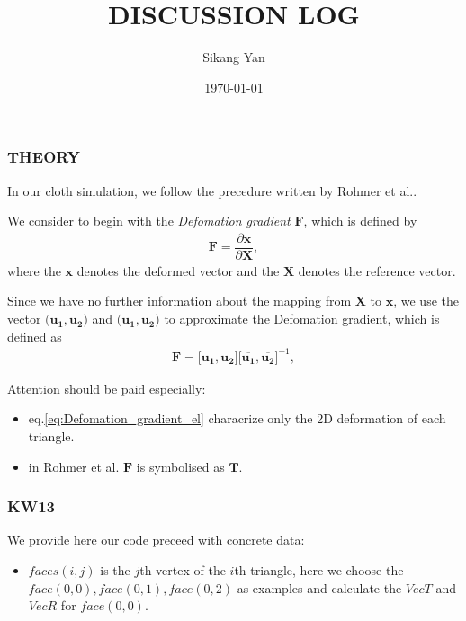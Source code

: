 \documentclass{beamer}
\title[Short title]{DISCUSSION LOG} %
\author{Sikang Yan} %
\institute[TUK] %
{
University of Kaiserslautern \\ %
\medskip
\textit{yan@rhrk.uni-kl.de} %
}
\date{\today} %
\begin{document}
\begin{frame}
\titlepage %
\end{frame}


\begin{frame}
\frametitle{THEORY}
In our cloth simulation, we follow the precedure written by Rohmer et al..


We consider to begin with the \emph{Defomation gradient} $\mathbf{F}$, which is defined by
\begin{align}
\mathbf{F} = \dfrac{\partial\mathbf{x}}{\partial\mathbf{X}},  
\end{align}
where the $\mathbf{x}$ denotes the deformed vector and the $\mathbf{X}$ denotes the reference vector.


Since we have no further information about the mapping from $\mathbf{X}$ to 
$\mathbf{x}$, we use the vector $\big(\mathbf{u_1},\mathbf{u_2}\big)$ and $\big(\overline{\mathbf{u_1}},\overline{\mathbf{u_2}}\big)$ to approximate the Defomation gradient, which is defined as
\begin{align}
\mathbf{F} = 
\big[\mathbf{u_1},\mathbf{u_2}\big]
\big[\overline{\mathbf{u_1}},\overline{\mathbf{u_2}}\big]^{-1}, 
\label{eq:Defomation_gradient_el} 
\end{align}

Attention should be paid especially:
\begin{itemize}
\item eq.\eqref{eq:Defomation_gradient_el} characrize only the 2D deformation of each triangle.
\item in Rohmer et al. $\mathbf{F}$ is symbolised as $\mathbf{T}$.
\end{itemize}
\end{frame}


\begin{frame}
\frametitle{KW13}
We provide here our code preceed with concrete data:
\begin{itemize}
\item $faces(i,j)$ is the $j$th vertex of the $i$th triangle, here we choose the $face(0,0),face(0,1),face(0,2)$ as examples and calculate the $VecT$ and $VecR$ for $face(0,0)$.
\end{itemize}
\end{frame}

\end{document}
